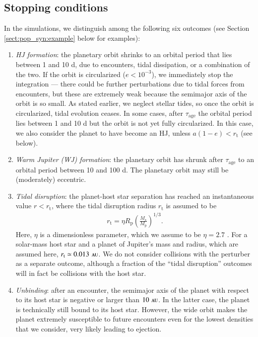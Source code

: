 \documentclass[iop,usenatbib]{emulateapj}
\renewcommand{\S}{Section}
\newcommand{\au}{\,\textsc{au}}
\begin{document}
\subsection{Stopping conditions}
\label{sect:pop_syn:sc}
In the simulations, we distinguish among the following six outcomes (see \S\,\ref{sect:pop_syn:example} below for examples):
\begin{enumerate}

\item {\it HJ formation}: the planetary orbit shrinks to an orbital period that lies between 1 and 10 d, due to encounters, tidal dissipation, or a combination of the two. If the orbit is circularized ($e<10^{-3}$), we immediately stop the integration --- there could be further perturbations due to tidal forces from encounters, but these are extremely weak because the semimajor axis of the orbit is so small. As stated earlier, we neglect stellar tides, so once the orbit is circularized, tidal evolution ceases. In some cases, after $\tau_\mathrm{age}$ the orbital period  lies between 1 and 10 d but the orbit is not yet fully circularized. In this case, we also consider the planet to have become an HJ, unless $a(1-e)<r_\mathrm{t}$ (see below).

\item {\it Warm Jupiter (WJ) formation}: the planetary orbit has shrunk after $\tau_\mathrm{age}$ to an orbital period between 10 and 100 d. The planetary orbit may still be (moderately) eccentric.

\item {\it Tidal disruption}: the planet-host star separation has reached an instantaneous value $r < r_\mathrm{t}$, where the tidal disruption radius $r_\mathrm{t}$ is assumed to be
\begin{align}
\label{eq:r_t}
r_\mathrm{t} = \eta R_\mathrm{p} \left (\frac{ M_\star }{M_\mathrm{p}} \right )^{1/3}.
\end{align}
Here, $\eta$ is a dimensionless parameter, which we assume to be $\eta=2.7$ \citep{2011ApJ...732...74G}. For a solar-mass host star and a planet of Jupiter's mass and radius, which are assumed here, $r_\mathrm{t}\simeq0.013\,\au$. We do not consider collisions with the perturber as a separate outcome, although a fraction of the ``tidal disruption'' outcomes will in fact be collisions with the host star.

\item {\it Unbinding}: after an encounter, the semimajor axis of the planet with respect to its host star is negative or larger than $10\,\au$. In the latter case, the planet is technically still bound to its host star. However, the wide orbit makes the planet extremely susceptible to future encounters even for the lowest densities that we consider, very likely leading to ejection. 


\end{enumerate}
\end{document}
